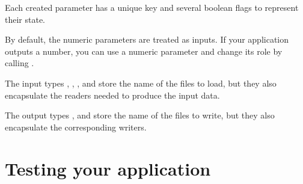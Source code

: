 Each created parameter has a unique key and several boolean flags to represent their state.

By default, the numeric parameters are treated as inputs. If your application outputs a number,
you can use a numeric parameter and change its role by calling .

The input types , , , 
and  store the name of the files to load, but they also encapsulate the 
readers needed to produce the input data.

The output types ,  and  store the 
name of the files to write, but they also encapsulate the corresponding writers.



\section{Testing your application}
\label{sec:appTesting}
